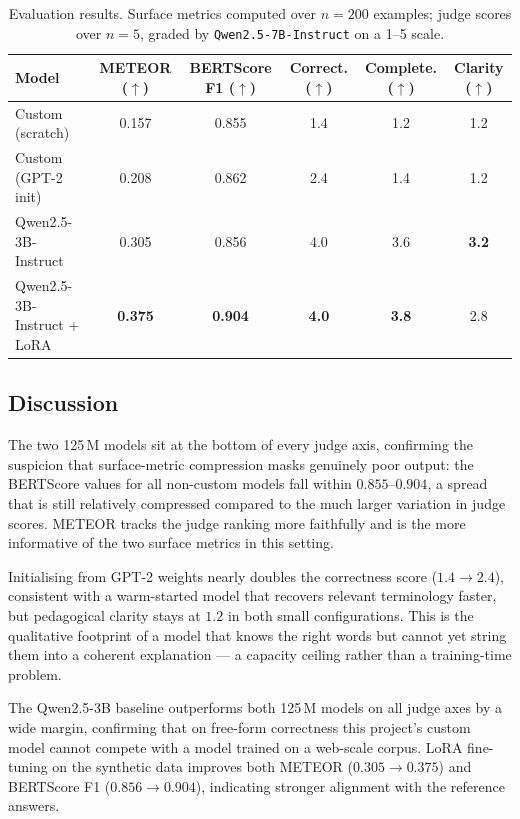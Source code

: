 \begin{table}[h]
\centering
\caption{Evaluation results. Surface metrics computed over $n=200$ examples; judge
scores over $n=5$, graded by \texttt{Qwen2.5-7B-Instruct} on a 1--5 scale.}
\label{tab:eval}
\small
\setlength{\tabcolsep}{4pt}
\begin{tabular}{lccccc}
\toprule
\textbf{Model}
  & \textbf{METEOR} ($\uparrow$)
  & \textbf{BERTScore F1} ($\uparrow$)
  & \textbf{Correct.} ($\uparrow$)
  & \textbf{Complete.} ($\uparrow$)
  & \textbf{Clarity} ($\uparrow$) \\
\midrule
Custom (scratch)            & 0.157 & 0.855 & 1.4 & 1.2 & 1.2 \\
Custom (GPT-2 init)         & 0.208 & 0.862 & 2.4 & 1.4 & 1.2 \\
Qwen2.5-3B-Instruct         & 0.305 & 0.856 & 4.0 & 3.6 & \textbf{3.2} \\
Qwen2.5-3B-Instruct + LoRA  & \textbf{0.375} & \textbf{0.904} & \textbf{4.0} & \textbf{3.8} & 2.8 \\
\bottomrule
\end{tabular}
\end{table}

\subsection{Discussion}

The two 125\,M models sit at the bottom of every judge axis, confirming the suspicion
that surface-metric compression masks genuinely poor output: the BERTScore values for
all non-custom models fall within $0.855$--$0.904$, a spread that is still relatively
compressed compared to the much larger variation in judge scores. METEOR tracks the
judge ranking more faithfully and is the more informative of the two surface metrics in
this setting.

Initialising from GPT-2 weights nearly doubles the correctness score ($1.4 \to 2.4$),
consistent with a warm-started model that recovers relevant terminology faster, but
pedagogical clarity stays at $1.2$ in both small configurations. This is the qualitative
footprint of a model that knows the right words but cannot yet string them into a
coherent explanation --- a capacity ceiling rather than a training-time problem.

The Qwen2.5-3B baseline outperforms both 125\,M models on all judge axes by a wide
margin, confirming that on free-form correctness this project's custom model cannot
compete with a model trained on a web-scale corpus. LoRA fine-tuning on the synthetic
data improves both METEOR ($0.305 \to 0.375$) and BERTScore F1 ($0.856 \to 0.904$),
indicating stronger alignment with the reference answers.

